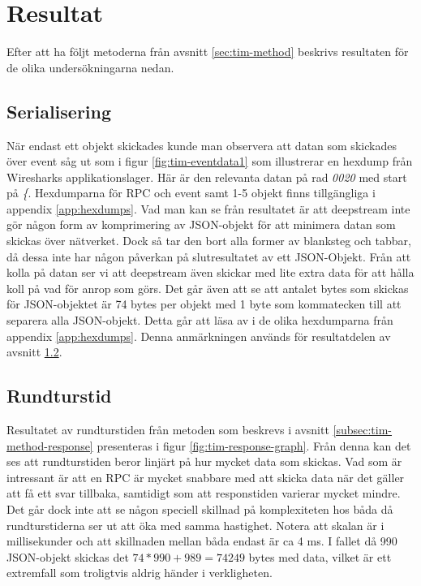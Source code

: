\section{Resultat}
\label{sec:tim-results}
Efter att ha följt metoderna från avsnitt \ref{sec:tim-method} beskrivs resultaten för de olika undersökningarna nedan. 

\subsection{Serialisering}
När endast ett objekt skickades kunde man observera att datan som skickades över event såg ut som i figur \ref{fig:tim-eventdata1} som illustrerar en hexdump från Wiresharks applikationslager. Här är den relevanta datan på rad \textit{0020} med start på \textit{\{}. Hexdumparna för RPC och event samt 1-5 objekt finns tillgängliga i appendix \ref{app:hexdumps}. Vad man kan se från resultatet är att deepstream inte gör någon form av komprimering av JSON-objekt för att minimera datan som skickas över nätverket. Dock så tar den bort alla former av blanksteg och tabbar, då dessa inte har någon påverkan på slutresultatet av ett JSON-Objekt. Från att kolla på datan ser vi att deepstream även skickar med lite extra data för att hålla koll på vad för anrop som görs. Det går även att se att antalet bytes som skickas för JSON-objektet är 74 bytes per objekt med 1 byte som kommatecken till att separera alla JSON-objekt. Detta går att läsa av i de olika hexdumparna från appendix \ref{app:hexdumps}. Denna anmärkningen används för resultatdelen av avsnitt \ref{subsec:tim-result-response}.

\subsection{Rundturstid}
\label{subsec:tim-result-response}
Resultatet av rundturstiden från metoden som beskrevs i avsnitt \ref{subsec:tim-method-response} presenteras i figur \ref{fig:tim-response-graph}. Från denna kan det ses att rundturstiden beror linjärt på hur mycket data som skickas. Vad som är intressant är att en RPC är mycket snabbare med att skicka data när det gäller att få ett svar tillbaka, samtidigt som att responstiden varierar mycket mindre. Det går dock inte att se någon speciell skillnad på komplexiteten hos båda då rundturstiderna ser ut att öka med samma hastighet. Notera att skalan är i millisekunder och att skillnaden mellan båda endast är ca 4 ms. I fallet då 990 JSON-objekt skickas det $74*990+989=74249$ bytes med data, vilket är ett extremfall som troligtvis aldrig händer i verkligheten.

